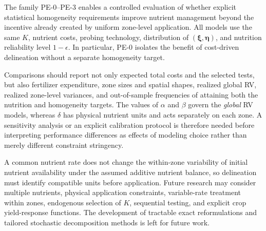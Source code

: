 The family PE-0--PE-3 enables a controlled evaluation of whether
explicit statistical homogeneity requirements improve nutrient
management beyond the incentive already created by uniform
zone-level application. All models use the same $K$, nutrient costs,
probing technology, distribution of $(\boldsymbol\xi,\boldsymbol\eta)$,
and nutrition reliability level $1-\epsilon$. In particular, PE-0
isolates the benefit of cost-driven delineation without a separate
homogeneity target.

Comparisons should report not only expected total costs and the
selected tests, but also fertilizer expenditure, zone sizes and
spatial shapes, realized global RV, realized zone-level variances, and
out-of-sample frequencies of attaining both the nutrition and
homogeneity targets. The values of $\alpha$ and $\beta$ govern the
\emph{global} RV models, whereas $\delta$ has physical nutrient units
and acts separately on each zone. A sensitivity analysis or an
explicit calibration protocol is therefore needed before interpreting
performance differences as effects of modeling choice rather than
merely different constraint stringency.

A common nutrient rate does not change the within-zone variability
of initial nutrient availability under the assumed additive nutrient
balance, so delineation must identify compatible units before
application. Future research may consider multiple nutrients,
physical application constraints, variable-rate treatment within
zones, endogenous selection of $K$, sequential testing, and explicit
crop yield-response functions. The development of tractable exact
reformulations and tailored stochastic decomposition methods is left
for future work.

